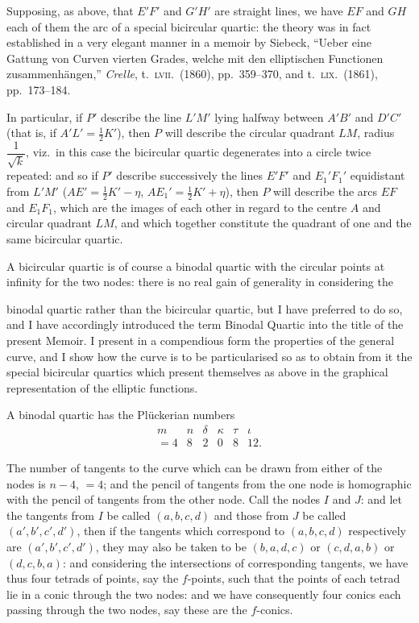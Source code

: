 \documentclass[11pt,a4paper]{article}
\begin{document}
\smallskip
Supposing, as above, that $E'F'$ and $G'H'$ are straight lines, we have $EF$ and $GH$ each of them the arc of a special bicircular quartic: the theory was in fact established in a very elegant manner in a memoir by Siebeck, ``Ueber eine Gattung von Curven vierten Grades, welche mit den elliptischen Functionen zusammenh\"angen,'' \emph{Crelle}, t.\ \textsc{lvii}.\ (1860), pp.\ 359--370, and t.\ \textsc{lix}.\ (1861), pp.\ 173--184.

\smallskip
In particular, if $P'$ describe the line $L'M'$ lying halfway between $A'B'$ and $D'C'$ (that is, if $A'L' = \tfrac{1}{2}K'$), then $P$ will describe the circular quadrant $LM$, radius $\dfrac{1}{\sqrt{k}}$, viz.\ in this case the bicircular quartic degenerates into a circle twice repeated: and so if $P'$ describe successively the lines $E'F'$ and $E_1'F_1'$ equidistant from $L'M'$ ($AE' = \tfrac{1}{2}K' - \eta$, $AE_1' = \tfrac{1}{2}K' + \eta$), then $P$ will describe the arcs $EF$ and $E_1F_1$, which are the images of each other in regard to the centre $A$ and circular quadrant $LM$, and which together constitute the quadrant of one and the same bicircular quartic.

\smallskip
A bicircular quartic is of course a binodal quartic with the circular points at infinity for the two nodes: there is no real gain of generality in considering the

\newpage

binodal quartic rather than the bicircular quartic, but I have preferred to do so, and I have accordingly introduced the term Binodal Quartic into the title of the present Memoir. I present in a compendious form the properties of the general curve, and I show how the curve is to be particularised so as to obtain from it the special bicircular quartics which present themselves as above in the graphical representation of the elliptic functions.

\smallskip
A binodal quartic has the Pl\"uckerian numbers
\[
\begin{array}{cccccc}
m & n & \delta & \kappa & \tau & \iota \\
= 4 & 8 & 2 & 0 & 8 & 12.
\end{array}
\]

The number of tangents to the curve which can be drawn from either of the nodes is $n - 4$, $= 4$; and the pencil of tangents from the one node is homographic with the pencil of tangents from the other node. Call the nodes $I$ and $J$: and let the tangents from $I$ be called $(a, b, c, d)$ and those from $J$ be called $(a', b', c', d')$, then if the tangents which correspond to $(a, b, c, d)$ respectively are $(a', b', c', d')$, they may also be taken to be $(b, a, d, c)$ or $(c, d, a, b)$ or $(d, c, b, a)$: and considering the intersections of corresponding tangents, we have thus four tetrads of points, say the $f$-points, such that the points of each tetrad lie in a conic through the two nodes: and we have consequently four conics each passing through the two nodes, say these are the $f$-conics.
\end{document}
